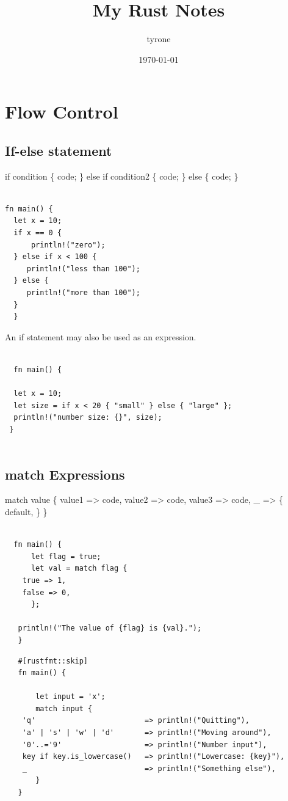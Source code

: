 \documentclass[11pt]{article}
\author{tyrone}
\date{\today}
\title{My Rust Notes}
\begin{document}
\maketitle
\tableofcontents

\section{Flow Control}
\label{sec:org9b47a65}
\subsection{If-else statement}
\label{sec:org01b0c37}

if condition \{
     code;
\} else if condition2 \{
     code;
\} else \{
     code;
\}

\begin{verbatim}

fn main() {
  let x = 10;
  if x == 0 {
      println!("zero");
  } else if x < 100 {
     println!("less than 100");
  } else {
     println!("more than 100");
  }
  }

\end{verbatim}

An if statement may also be used as an expression.

\begin{verbatim}

  fn main() {

  let x = 10;
  let size = if x < 20 { "small" } else { "large" };
  println!("number size: {}", size);
 }


\end{verbatim}
\subsection{match Expressions}
\label{sec:org4489108}

match value \{
    value1 => code,
    value2 => code,
    value3 => code,
    \_ => \{
        default,
        \}
    \}


\begin{verbatim}

  fn main() {
      let flag = true;
      let val = match flag {
  	true => 1,
  	false => 0,
      };

   println!("The value of {flag} is {val}.");
   }

\end{verbatim}

\begin{verbatim}
   #[rustfmt::skip]
   fn main() {

       let input = 'x';
       match input {
   	'q'                         => println!("Quitting"),
   	'a' | 's' | 'w' | 'd'       => println!("Moving around"),
   	'0'..='9'                   => println!("Number input"),
   	key if key.is_lowercase()   => println!("Lowercase: {key}"),
   	_                           => println!("Something else"),
       }
   }



\end{verbatim}
\end{document}
